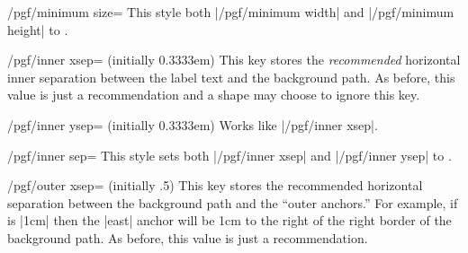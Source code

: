 \begin{key}{/pgf/minimum size=}
  This style both |/pgf/minimum width| and |/pgf/minimum height| to .
\end{key}


\begin{key}{/pgf/inner xsep= (initially 0.3333em)}
  This key stores the \emph{recommended} horizontal
  inner separation between the label text and the background path. As
  before, this value is just a recommendation and a shape may choose
  to ignore this key.

\begin{codeexample}[]
\end{codeexample}
\end{key}

\begin{key}{/pgf/inner ysep= (initially 0.3333em)}
  Works like |/pgf/inner xsep|.
\end{key}

\begin{key}{/pgf/inner sep=}
  This style sets both |/pgf/inner xsep| and |/pgf/inner ysep| to .
\end{key}



\begin{key}{/pgf/outer xsep= (initially .5\string\pgflinewidth)}
  This key stores the recommended horizontal separation between the
  background path and the ``outer anchors.'' For example, if
   is |1cm| then the |east| anchor will be 1cm to the
  right of the right border of the background path.
  As before, this value is just a recommendation.

\begin{codeexample}[]
\end{codeexample}
\end{key}

